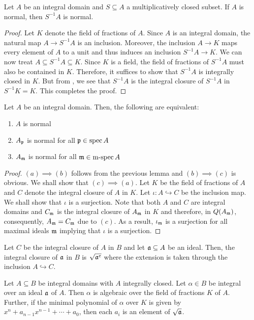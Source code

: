 \begin{lemma}
    Let $A$ be an integral domain and $S\subseteq A$ a multiplicatively closed subset. If $A$ is normal, then $S^{-1}A$ is normal.
\end{lemma}
\begin{proof}
    Let $K$ denote the field of fractions of $A$. Since $A$ is an integral domain, the natural map $A\to S^{-1}A$ is an inclusion. Moreover, the inclusion $A\to K$ maps every element of $A$ to a unit and thus induces an inclusion $S^{-1}A\to K$. We can now treat $A\subseteq S^{-1}A\subseteq K$. Since $K$ is a field, the field of fractions of $S^{-1}A$ must also be contained in $K$. Therefore, it suffices to show that $S^{-1}A$ is integrally closed in $K$. But from , we see that $S^{-1}A$ is the integral closure of $S^{-1}A$ in $S^{-1}K = K$. This completes the proof.
\end{proof}

\begin{proposition}
    Let $A$ be an integral domain. Then, the following are equivalent: 
    \begin{enumerate}
        \item $A$ is normal 
        \item $A_\mathfrak p$ is normal for all $\mathfrak p\in\operatorname{spec} A$ 
        \item $A_\mathfrak m$ is normal for all $\mathfrak m\in\operatorname{m-spec} A$
    \end{enumerate}
\end{proposition}
\begin{proof}
    $(a)\implies(b)$ follows from the previous lemma and $(b)\implies(c)$ is obvious. We shall show that $(c)\implies(a)$. Let $K$ be the field of fractions of $A$ and $C$ denote the integral closure of $A$ in $K$. Let $\iota:A\hookrightarrow C$ be the inclusion map. We shall show that $\iota$ is a surjection. Note that both $A$ and $C$ are integral domains and $C_\mathfrak m$ is the integral closure of $A_\mathfrak m$ in $K$ and therefore, in $Q(A_\mathfrak m)$, consequently, $A_\mathfrak m = C_\mathfrak m$ due to $(c)$. As a result, $\iota_\mathfrak m$ is a surjection for all maximal ideals $\mathfrak m$ implying that $\iota$ is a surjection.
\end{proof}

\begin{lemma}
    Let $C$ be the integral closure of $A$ in $B$ and let $\mathfrak a\subseteq A$ be an ideal. Then, the integral closure of $\mathfrak a$ in $B$ is $\sqrt{\mathfrak a^e}$ where the extension is taken through the inclusion $A\hookrightarrow C$.
\end{lemma}

\begin{proposition}
    Let $A\subseteq B$ be integral domains with $A$ integrally closed. Let $\alpha\in B$ be integral over an ideal $\mathfrak a$ of $A$. Then $\alpha$ is algebraic over the field of fractions $K$ of $A$. Further, if the minimal polynomial of $\alpha$ over $K$ is given by $x^n + a_{n - 1}x^{n - 1} + \cdots + a_0$, then each $a_i$ is an element of $\sqrt{\mathfrak a}$.
\end{proposition}